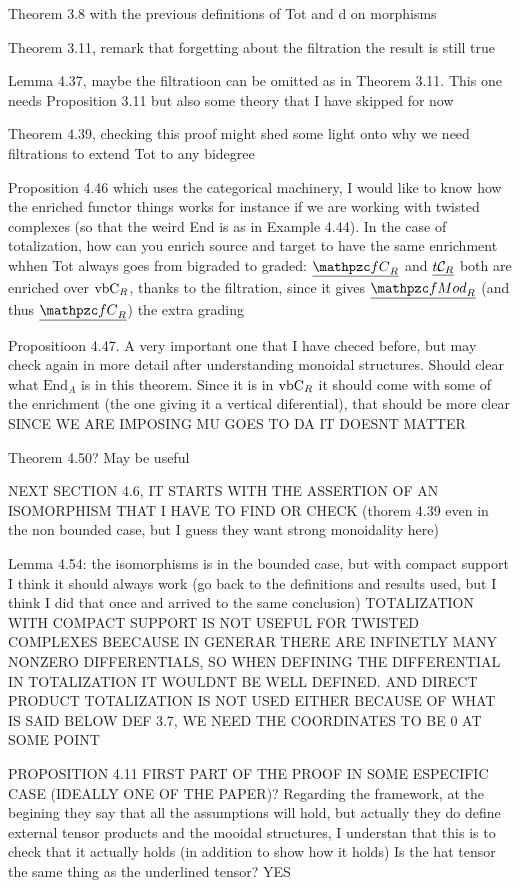 \documentclass[twoside]{article}
\begin{document}
Theorem 3.8 with the previous definitions of Tot and d on morphisms

Theorem 3.11, remark that forgetting about the filtration the result is still true

Lemma 4.37, maybe the filtratioon can be omitted as in Theorem 3.11. This one needs Proposition 3.11 but also some theory that I have skipped for now

Theorem 4.39, checking this proof might shed some light onto why we need filtrations to extend Tot to any bidegree

Proposition 4.46 which uses the categorical machinery, I would like to know how the enriched functor things works for instance if we are working with twisted complexes (so that the weird End is as in Example 4.44). In the case of totalization, how can you enrich source and target to have the same enrichment whhen Tot always goes from bigraded to graded: $\ufC$ and $\underline{t\mathcal{C}_R}$ both are enriched over $\mathrm{vbC}_R$, thanks to the filtration, since it gives $\ufMod$ (and thus $\ufC$) the extra grading

Propositioon 4.47. A very important one that I have checed before, but may check again in more detail after understanding monoidal structures. Should clear what $\mathrm{End}_A$ is in this theorem. Since it is in $\mathrm{vbC}_R$ it should come with some of the enrichment (the one giving it a vertical diferential), that should be more clear SINCE WE ARE IMPOSING MU GOES TO DA IT DOESNT MATTER

Theorem 4.50? May be useful

NEXT SECTION 4.6, IT STARTS WITH THE ASSERTION OF AN ISOMORPHISM THAT I HAVE TO FIND OR CHECK (thorem 4.39 even in the non bounded case, but I guess they want strong monoidality here)

Lemma 4.54: the isomorphisms is in the bounded case, but with compact support I think it should always work (go back to the definitions and results used, but I think I did that once and arrived to the same conclusion) TOTALIZATION WITH COMPACT SUPPORT IS NOT USEFUL FOR TWISTED COMPLEXES BEECAUSE IN GENERAR  THERE ARE INFINETLY MANY NONZERO DIFFERENTIALS, SO WHEN DEFINING THE DIFFERENTIAL IN TOTALIZATION IT WOULDNT BE WELL DEFINED. AND DIRECT PRODUCT TOTALIZATION IS NOT USED EITHER BECAUSE OF WHAT IS SAID BELOW DEF 3.7, WE NEED THE COORDINATES TO BE 0 AT SOME POINT

PROPOSITION 4.11 FIRST PART OF THE PROOF IN SOME ESPECIFIC CASE (IDEALLY ONE OF THE PAPER)?
Regarding the framework, at the begining they say that all the assumptions will hold, but actually they do define external tensor products and the mooidal structures, I understan that this is to check that it actually holds (in addition to show how it holds) Is the hat tensor the same thing as the underlined tensor? YES
\end{document}
